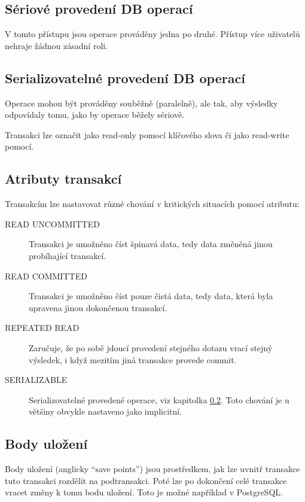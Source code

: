 \subsection{Sériové provedení DB operací}
V tomto přístupu jsou operace prováděny jedna po druhé. Přístup více uživatelů nehraje žádnou zásadní roli.

\subsection{Serializovatelné provedení DB operací}\label{sec:ser}
Operace mohou být prováděny souběžně (paralelně), ale tak, aby výsledky odpovídaly tomu, jako by operace běžely sériově.

Transakci lze označit jako read-only pomocí klíčového slova či jako read-write pomocí.

\subsection{Atributy transakcí}
Transakcím lze nastavovat různé chování v kritických situacích pomocí atributu:
\begin{description}
\item[READ UNCOMMITTED] Transakci je umožněno číst špinavá data, tedy data změněná jinou probíhající transakcí.
\item[READ COMMITTED] Transakci je umožněno číst pouze čistá data, tedy data, která byla upravena jinou dokončenou transakcí.
\item[REPEATED READ] Zaručuje, že po sobě jdoucí provedení stejného dotazu vrací stejný výsledek, i když mezitím jiná transakce provede commit.
\item[SERIALIZABLE] Serializovatelné provedené operace, viz kapitolka \ref{sec:ser}. Toto chování je u většiny  obvykle nastaveno jako implicitní.
\end{description}

\subsection{Body uložení}
Body uložení (anglicky \enquote{save points}) jsou prostředkem, jak lze uvnitř transakce tuto transakci rozdělit na podtransakci. Poté lze po dokončení celé transakce vracet změny k tomu bodu uložení. Toto je možné například v PostgreSQL.

